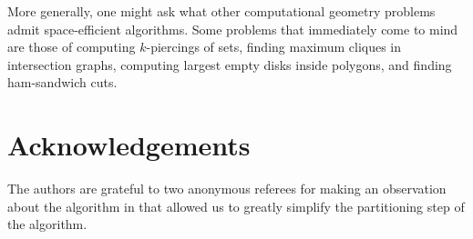 \documentclass{elsart}
\begin{document}
More generally, one might ask what other computational geometry
problems admit space-efficient algorithms.  Some problems that
immediately come to mind are those of computing $k$-piercings of sets,
finding maximum cliques in intersection graphs, computing largest
empty disks inside polygons, and finding ham-sandwich cuts.

\section*{Acknowledgements}

The authors are grateful to two anonymous referees for making an
observation about the algorithm in  that allowed us to
greatly simplify the partitioning step of the algorithm.



\end{document}
